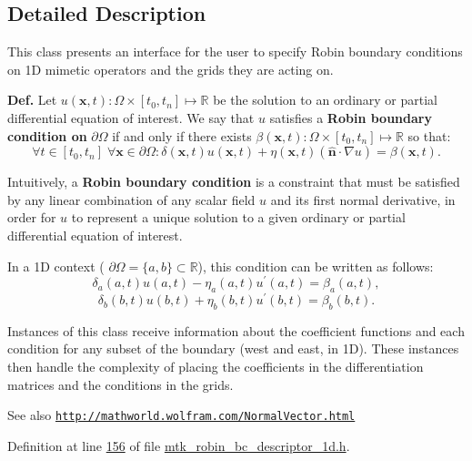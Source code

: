 \subsection{Detailed Description}
This class presents an interface for the user to specify Robin boundary conditions on 1\+D mimetic operators and the grids they are acting on.

{\bfseries Def.} Let $ u(\mathbf{x},t):\Omega\times [t_0, t_n]\mapsto\mathbb{R} $ be the solution to an ordinary or partial differential equation of interest. We say that $ u $ satisfies a {\bfseries Robin boundary condition on} $ \partial\Omega $ if and only if there exists $ \beta(\mathbf{x},t):\Omega\times [t_0, t_n]\mapsto\mathbb{R} $ so that\+: \[ \forall t \in [t_0,t_n]\; \forall \mathbf{x} \in \partial\Omega: \delta(\mathbf{x},t)u(\mathbf{x},t) + \eta(\mathbf{x},t)(\hat{\mathbf{n}}\cdot\nabla u) = \beta(\mathbf{x},t). \]

Intuitively, a {\bfseries Robin boundary condition} is a constraint that must be satisfied by any linear combination of any scalar field $ u $ and its first normal derivative, in order for $ u $ to represent a unique solution to a given ordinary or partial differential equation of interest.

In a 1\+D context ( $ \partial\Omega = \{a,b\}\subset\mathbb{R} $), this condition can be written as follows\+: \[ \delta_a(a,t)u(a,t) - \eta_a(a,t)u^\prime(a,t) = \beta_a(a,t), \] \[ \delta_b(b,t)u(b,t) + \eta_b(b,t)u^\prime(b,t) = \beta_b(b,t). \]

Instances of this class receive information about the coefficient functions and each condition for any subset of the boundary (west and east, in 1\+D). These instances then handle the complexity of placing the coefficients in the differentiation matrices and the conditions in the grids.

\begin{DoxySeeAlso}{See also}
\href{http://mathworld.wolfram.com/NormalVector.html}{\tt http\+://mathworld.\+wolfram.\+com/\+Normal\+Vector.\+html} 
\end{DoxySeeAlso}


Definition at line \hyperlink{mtk__robin__bc__descriptor__1d_8h_source_l00156}{156} of file \hyperlink{mtk__robin__bc__descriptor__1d_8h_source}{mtk\+\_\+robin\+\_\+bc\+\_\+descriptor\+\_\+1d.\+h}.



